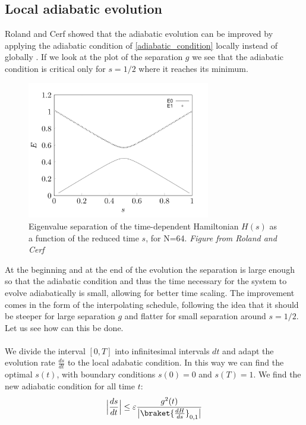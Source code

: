     \subsection{Local adiabatic evolution}\label{subsec:local adiabatic}
    Roland and Cerf showed that the adiabatic evolution can be improved by applying the adiabatic condition of \cref{adiabatic_condition} locally instead of globally \cite{Roland2002}. If we look at the plot of the separation $g$ we see that the adiabatic condition is critical only for $s=1/2$ where it reaches its minimum.
    \begin{figure}[h]
      \centering
      \includegraphics[width=80mm]{figures/chapter1/separation}
      \caption[Eigenvalue separation of the time-dependent Hamiltonian $H(s)$ as a function of the reduced time $s$, for N=64]{Eigenvalue separation of the time-dependent Hamiltonian $H(s)$ as a function of the reduced time $s$, for N=64. \textit{Figure from Roland and Cerf} \cite{Roland2002}}
      \label{separation_figure}
    \end{figure}
    At the beginning and at the end of the evolution the separation is large enough so that the adiabatic condition and thus the time necessary for the system to evolve adiabatically is small, allowing for better time scaling. The improvement comes in the form of the interpolating schedule, following the idea that it should be steeper for large separation $g$ and flatter for small separation around $s=1/2$. Let us see how can this be done. \\ \\
    We divide the interval $[0,T]$ into infinitesimal intervals $dt$ and adapt the evolution rate $\frac{ds}{dt}$ to the local adabatic condition. In this way we can find the optimal $s(t)$, with boundary conditions $s(0)=0$ and $s(T)=1$. We find the new adiabatic condition for all time $t$:
    \begin{equation}
      \Big|\frac{ds}{dt}\Big|\leq\varepsilon\frac{g^2(t)}{\big|\braket{\frac{dH}{ds}}_{0,1}\big|}
    \end{equation}
